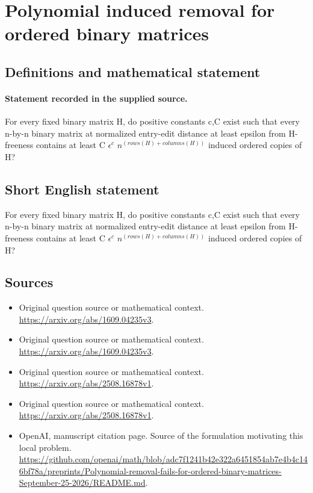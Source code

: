 \documentclass[11pt]{article}
\begin{document}
\section*{Polynomial induced removal for ordered binary matrices}\label{statement}
\subsection{Definitions and mathematical statement}
\paragraph{Statement recorded in the supplied source.}
For every fixed binary matrix H, do positive constants c,C exist such that every n-by-n binary matrix at normalized entry-edit distance at least epsilon from H-freeness contains at least C $\epsilon ^c$ $n^(rows(H)+columns(H))$ induced ordered copies of H?
\subsection{Short English statement}
For every fixed binary matrix H, do positive constants c,C exist such that every n-by-n binary matrix at normalized entry-edit distance at least epsilon from H-freeness contains at least C $\epsilon ^c$ $n^(rows(H)+columns(H))$ induced ordered copies of H?
\subsection{Sources}
\begin{itemize}
\item[S1] Original question source or mathematical context.
\url{https://arxiv.org/abs/1609.04235v3}.
\item[S2] Original question source or mathematical context.
\url{https://arxiv.org/abs/1609.04235v3}.
\item[S3] Original question source or mathematical context.
\url{https://arxiv.org/abs/2508.16878v1}.
\item[S4] Original question source or mathematical context.
\url{https://arxiv.org/abs/2508.16878v1}.
\item[S5] OpenAI, manuscript citation page. Source of the formulation motivating this local problem.
\url{https://github.com/openai/math/blob/adc7f1241b42e322a6451854ab7e4b4c146bf78a/preprints/Polynomial-removal-fails-for-ordered-binary-matrices-September-25-2026/README.md}.
\end{itemize}
\end{document}
